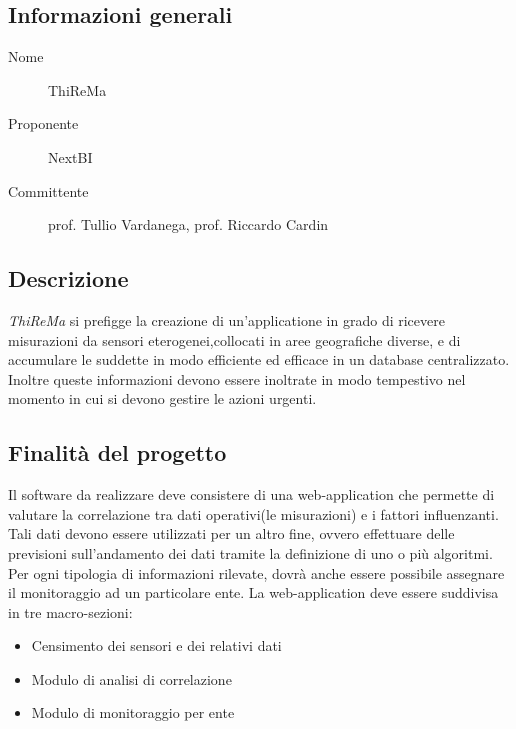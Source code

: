 \documentclass[../studio-di-fattibilita.tex]{subfiles}
\begin{document}
	\subsection{Informazioni generali}
	\label{subsec:informazioni_generali}
	\begin{description}
		\item[Nome] ThiReMa
		\item[Proponente] NextBI
		\item[Committente] prof. Tullio Vardanega, prof. Riccardo Cardin
	\end{description}
	\subsection{Descrizione}
	\label{subsec:descrizione}
	\textit{ThiReMa} si prefigge la creazione di un'applicatione in grado di ricevere misurazioni da sensori eterogenei,collocati in aree geografiche diverse, e di accumulare le suddette in modo efficiente ed efficace in un database centralizzato. Inoltre queste informazioni devono essere inoltrate in modo tempestivo nel momento in cui si devono gestire le azioni urgenti.
	\subsection{Finalità del progetto}
	\label{subsec:finalità_del_progetto}
	Il software da realizzare deve consistere di una web-application che permette di valutare la correlazione tra dati operativi(le misurazioni) e i fattori influenzanti. Tali dati devono essere utilizzati per un altro fine, ovvero effettuare delle previsioni sull'andamento dei dati tramite la definizione di uno o più algoritmi.
	Per ogni tipologia di informazioni rilevate, dovrà anche essere possibile assegnare il monitoraggio ad un particolare ente.
	La web-application deve essere suddivisa in tre macro-sezioni:
	\begin{itemize}
		\item Censimento dei sensori e dei relativi dati
		\item Modulo di analisi di correlazione
		\item Modulo di monitoraggio per ente
	\end{itemize}
\end{document}
